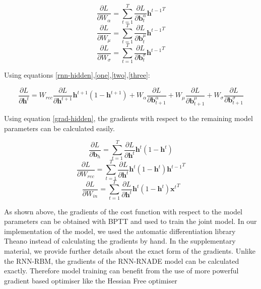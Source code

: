 \documentclass{article} %
\begin{document}
\begin{equation}
\frac{\partial L}{\partial W_{\alpha}} = \sum_{t=1}^T \frac{\partial L}{\partial \mathbf{b}^{\alpha}_{t}} {\mathbf{h}^{t-1}}^{T}
\end{equation}
\begin{equation}
\frac{\partial L}{\partial W_{\mu}} = \sum_{t=1}^T \frac{\partial L}{\partial \mathbf{b}^{\mu}_{t}} {\mathbf{h}^{t-1}}^{T}
\end{equation}
\begin{equation}
\frac{\partial L}{\partial W_{\sigma}} = \sum_{t=1}^T \frac{\partial L}{\partial \mathbf{b}^{\sigma}_{t}} {\mathbf{h}^{t-1}}^{T}
\end{equation}

Using equations \ref{rnn-hidden},\ref{one},\ref{two},\ref{three}:

\begin{equation}
\label{grad-hidden}
\frac{\partial L}{\partial \mathbf{h}^t} = W_{rec}\frac{\partial L}{\partial \mathbf{h}^{t+1}} \mathbf{h}^{t+1} (1 - \mathbf{h}^{t+1}) + W_{\alpha} \frac{\partial L}{\partial \mathbf{b}^{\alpha}_{t+1}} + W_{\mu} \frac{\partial L}{\partial \mathbf{b}^{\mu}_{t+1}} + W_{\sigma} \frac{\partial L}{\partial \mathbf{b}^{\sigma}_{t+1}}
\end{equation}

Using equation \ref{grad-hidden}, the gradients with respect to the remaining model parameters can be calculated easily. 

$$ \frac{\partial L}{\partial \mathbf{b}_{h}} =  \sum_{t=1}^{T} \frac{\partial L}{\partial \mathbf{h}^t} \mathbf{h}^t (1 - \mathbf{h}^t)$$
$$ \frac{\partial L}{\partial W_{rec}} = \sum_{t=1}^{T} \frac{\partial L}{\partial \mathbf{h}^t} \mathbf{h}^t (1 - \mathbf{h}^t) {\mathbf{h}^{t-1}}^T$$
$$ \frac{\partial L}{\partial W_{in}} = \sum_{t=1}^{T} \frac{\partial L}{\partial \mathbf{h}^t} \mathbf{h}^t (1 - \mathbf{h}^t) {\mathbf{x}^{t}}^T$$

As shown above, the gradients of the cost function with respect to the model parameters can be obtained with BPTT and used to train the joint model. In our implementation of the model, we used the automatic differentiation library Theano \cite{bergstra+al:2010-scipy} instead of calculating the gradients by hand. In the supplementary material, we provide further details about the exact form of the gradients. Unlike the RNN-RBM, the gradients of the RNN-RNADE model can be calculated exactly. Therefore model training can benefit from the use of more powerful gradient based optimiser like the Hessian Free optimiser \cite{Martens2011}
\end{document}
